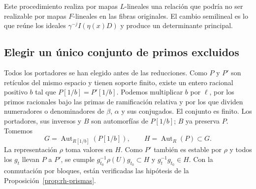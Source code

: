Este procedimiento realiza por mapas $L$-lineales una relación que podría no ser realizable por mapas $F$-lineales en las fibras originales. El cambio semilineal es lo que reúne los ideales $\gamma^{-j}I(\eta(x)D)$ y produce un determinante principal.

\subsection{Elegir un único conjunto de primos excluidos}

Todos los portadores se han elegido antes de las reducciones. Como $P$ y $P'$ son retículos del mismo espacio y tienen soporte finito, existe un entero racional positivo $b$ tal que $P[1/b]=P'[1/b]$. Podemos multiplicar $b$ por $\ell$, por los primos racionales bajo las primas de ramificación relativa y por los que dividen numeradores o denominadores de $\beta$, $\alpha$ y sus conjugados. El conjunto es finito. Los portadores, sus inversos y $B$ son automorfías de $P[1/b]$; $B$ ya preserva $P$. Tomemos
\[
 G=\operatorname{Aut}_{R[1/b]}(P[1/b]),\qquad
 H=\operatorname{Aut}_R(P)\subset G.
\]
La representación $\rho$ toma valores en $H$. Como $P'$ también es estable por $\rho$ y todos los $g_t$ llevan $P$ a $P'$, se cumple $g_{t_0}^{-1}\rho(U)g_{t_0}\subset H$ y $g_t^{-1}g_{t_0}\in H$. Con la conmutación por bloques, están verificadas las hipótesis de la Proposición~\ref{prop:rh-prismas}.


